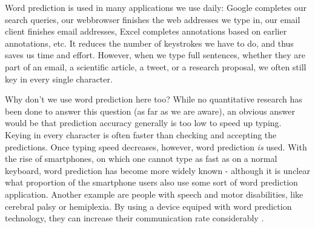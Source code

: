 \documentclass[12pt]{article}
\begin{document}
Word prediction is used in many applications we use daily: Google completes our search queries, our webbrowser finishes the web addresses we type in, our email client finishes email addresses, Excel completes annotations based on earlier annotations, etc. It reduces the number of keystrokes we have to do, and thus saves us time and effort. However, when we type full sentences, whether they are part of an email, a scientific article, a tweet, or a research proposal, we often still key in every single character. 

Why don't we use word prediction here too? While no quantitative research has been done to answer this question (as far as we are aware), an obvious answer would be that prediction accuracy generally is too low to speed up typing. Keying in every character is often faster than checking and accepting the predictions. Once typing speed decreases, however, word prediction \emph{is} used. With the rise of smartphones,  on which one  cannot type as fast as on a normal keyboard, word prediction has become more widely known - although it is unclear what proportion of the smartphone users also use some sort of word prediction application. Another example are  people with speech and motor disabilities, like cerebral palsy or hemiplexia. By using a device equiped with word prediction technology, they can increase their communication rate considerably \cite{Garay-Vitoria+06}.

\end{document}
